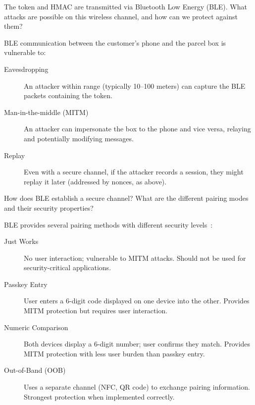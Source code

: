
\begin{exercise}
  The token and HMAC are transmitted via Bluetooth Low Energy (BLE).
  What attacks are possible on this wireless channel, and how can we protect 
  against them?
\end{exercise}

BLE communication between the customer's phone and the parcel box is vulnerable 
to:
\begin{description}
  \item[Eavesdropping] An attacker within range (typically 10--100 meters) can 
    capture the BLE packets containing the token.
  \item[Man-in-the-middle (MITM)] An attacker can impersonate the box to the 
    phone and vice versa, relaying and potentially modifying messages.
  \item[Replay] Even with a secure channel, if the attacker records a session, 
    they might replay it later (addressed by nonces, as above).
\end{description}

\begin{exercise}
  How does BLE establish a secure channel?
  What are the different pairing modes and their security properties?
\end{exercise}

BLE provides several pairing methods with different security
levels~\autocite{BluetoothCore}:
\begin{description}
  \item[Just Works] No user interaction; vulnerable to MITM attacks.
    Should not be used for security-critical applications.
  \item[Passkey Entry] User enters a 6-digit code displayed on one device into 
    the other.
    Provides MITM protection but requires user interaction.
  \item[Numeric Comparison] Both devices display a 6-digit number; user 
    confirms they match.
    Provides MITM protection with less user burden than passkey entry.
  \item[Out-of-Band (OOB)] Uses a separate channel (\ac{NFC}, QR code) to
    exchange pairing information.
    Strongest protection when implemented correctly.
\end{description}

